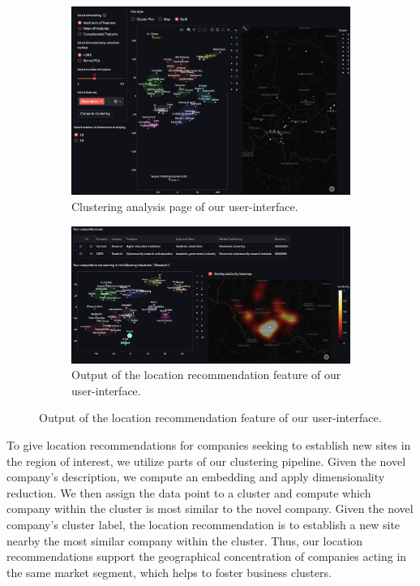 \documentclass[12pt]{article}
\begin{document}
   \begin{figure}[H]
   	\centering
   	\begin{subfigure}[b]{0.48\textwidth}
   		\centering
   		\includegraphics[width=\textwidth]{figures/clustering_analysis.png}
   		\caption{Clustering analysis page of our user-interface.}
   		\label{fig:clustering-analysis}
   	\end{subfigure}
   	\hfil
   	\begin{subfigure}[b]{0.48\textwidth}
   		\centering
   		\includegraphics[width=\textwidth]{figures/location_recommendation_output.png}
   		\caption{Output of the location recommendation feature of our user-interface.}
   		\label{fig:location-recommendation-output}
   	\end{subfigure}
   \end{figure}
   
   To give location recommendations for companies seeking to establish new sites in the region of interest, we utilize parts of our clustering pipeline. Given the novel company's description, we compute an embedding and apply dimensionality reduction. We then assign the data point to a cluster and compute which company within the cluster is most similar to the novel company.
   Given the novel company's cluster label, the location recommendation is to establish a new site nearby the most similar company within the cluster. Thus, our location recommendations support the geographical concentration of companies acting in the same market segment, which helps to foster business clusters.
   
\end{document}
